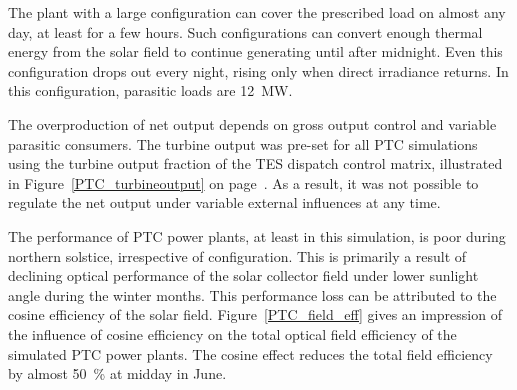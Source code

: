 The plant with a large configuration can cover the prescribed load on almost any day, at least for a few hours. Such configurations can convert enough thermal energy from the solar field to continue generating until after midnight. Even this configuration drops out every night, rising only when direct irradiance returns. In this configuration, parasitic loads are \SI{12}{MW}. 



The overproduction of net output depends on gross output control and variable parasitic consumers. The turbine output was pre-set for all PTC simulations using the turbine output fraction of the TES dispatch control matrix, illustrated in Figure~\ref{PTC_turbineoutput} on page~\pageref{PTC_turbineoutput}. As a result, it was not possible to regulate the net output under variable external influences at any time.


The performance of PTC power plants, at least in this simulation, is poor during northern solstice, irrespective of configuration. This is primarily a result of declining optical performance of the solar collector field under lower sunlight angle during the winter months. This performance loss can be attributed to the cosine efficiency of the solar field. Figure~\ref{PTC_field_eff} gives an impression of the influence of cosine efficiency on the total optical field efficiency of the simulated PTC power plants. The cosine effect reduces the total field efficiency by almost \SI{50}{\percent} at midday in June. 


